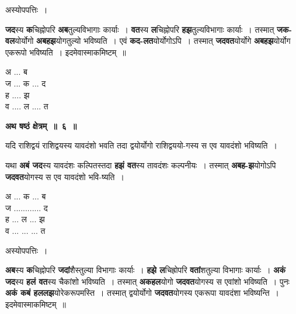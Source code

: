 \documentclass[11pt, openany]{book}
\begin{document}
\begin{center}
अस्योपपत्तिः~। 
\end{center}

\begin{flushleft}
\begin{minipage}[t]{0.65\textwidth}
\textbf{जद}स्य \textbf{क}चिह्नोपरि \textbf{अब}तुल्यविभागाः कार्याः~। \textbf{वत}स्य \textbf{ल}चिह्नोपरि \textbf{हझ}तुल्यविभागाः कार्याः~। तस्मात् \textbf{जक-वल}योर्योगो \textbf{अबहझ}योगतुल्यो भविष्यति~। एवं \textbf{कद-लत}योर्योगोऽपि~। तस्मात् \textbf{जदवत}योर्योगे \textbf{अबहझ}योर्योग एकरूपो भविष्यति~। इदमेवास्माकमिष्टम्~॥
\end{minipage} 
\hfill
\begin{minipage}[t]{0.25\textwidth}
अ ... ब\\
ज ... क ... द\\
ह .... झ\\
व .... ल .... त
\end{minipage}
\end{flushleft}
\vspace{-3mm}

\newpage
\begin{center}
\textbf{\large अथ षष्ठं क्षेत्रम्~॥~६~॥}
\end{center}

 {\ab यदि राशिद्वयं राशिद्वयस्य यावदंशो भवति तदा द्वयोर्योगो राशिद्वययो-गस्य स एव यावदंशो भविष्यति~। }

\begin{flushleft}
\begin{minipage}[t]{0.58\textwidth}
\vspace{-3mm}
\hspace{4mm} यथा \textbf{अबं जद}स्य यावदंशः कल्पितस्तदा \textbf{हझं वत}स्य तावदंशः कल्पनीयः~। तस्मात् \textbf{अबह-झ}योगोऽपि \textbf{जदवत}योगस्य स एव यावदंशो भवि-ष्यति~।
\end{minipage} 
\hfill
\begin{minipage}[t]{0.3\textwidth}
अ ... क ... ब \\
ज ............ द \\
ह ... ल ... झ \\
व ... ... ... त
\end{minipage}
\end{flushleft}

\begin{center}
अस्योपपत्तिः~।
\end{center}

\textbf{अब}स्य \textbf{क}चिह्नोपरि \textbf{जदां}शैस्तुल्या विभागाः कार्याः~। \textbf{हझे ल}चिह्रोपरि \textbf{वतां}शतुल्या विभागाः कार्याः~। \textbf{अकं जद}स्य \textbf{हलं वत}स्य चैकांशो भविष्यति~। तस्मात् \textbf{अकहल}योगो \textbf{जदवत}योगस्य स एवांशो भविष्यति~। पुनः \textbf{अकं कबं हललझ}योरेकरूपमस्ति~। तस्मात् द्वयोर्योगो \textbf{जदवत}योगस्य एकरूपा यावदंशा भविष्यन्ति~। इदमेवास्माकमिष्टम्~॥ 
\vspace{2mm}
\end{document}
